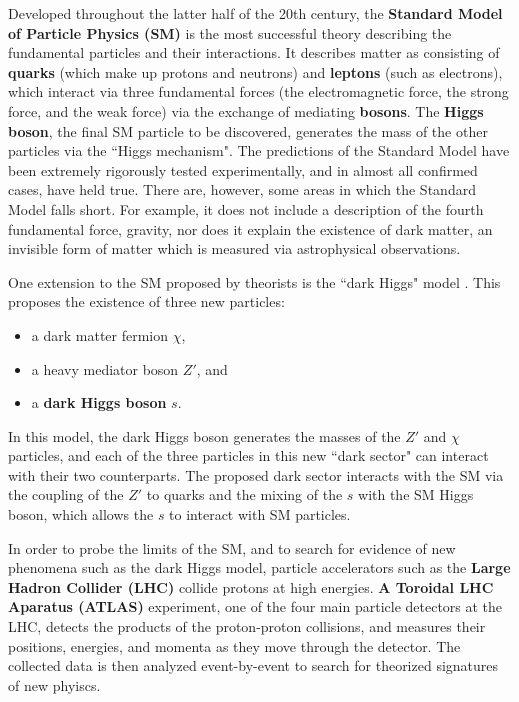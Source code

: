 \label{chapter:introduction}

Developed throughout the latter half of the 20th century, the \textbf{Standard Model of Particle Physics (SM)} \cite{peskin,schwartz,pdg_rev,Griffiths} is the most successful theory describing the fundamental particles and their interactions. It describes matter as consisting of \textbf{quarks} (which make up protons and neutrons) and \textbf{leptons} (such as electrons), which interact via three fundamental forces (the electromagnetic force, the strong force, and the weak force) via the exchange of mediating \textbf{bosons}. The \textbf{Higgs boson}, the final SM particle to be discovered, generates the mass of the other particles via the ``Higgs mechanism".  The predictions of the Standard Model have been extremely rigorously tested experimentally, and in almost all confirmed cases, have held true. There are, however, some areas in which the Standard Model falls short. For example, it does not include a description of the fourth fundamental force, gravity, nor does it explain the existence of dark matter, an invisible form of matter which is measured via astrophysical observations.

One extension to the SM proposed by theorists is the ``dark Higgs" model \cite{Hunting}. This proposes the existence of three new particles:
\begin{itemize}
\item a dark matter fermion $\chi$,
\item a heavy mediator boson $Z'$, and
\item a \textbf{dark Higgs boson} $s$.
\end{itemize}
In this model, the dark Higgs boson generates the masses of the $Z'$ and $\chi$ particles, and each of the three particles in this new ``dark sector" can interact with their two counterparts. The proposed dark sector interacts with the SM via the coupling of the $Z'$ to quarks and the mixing of the $s$ with the SM Higgs boson, which allows the $s$ to interact with SM particles.

In order to probe the limits of the SM, and to search for evidence of new phenomena such as the dark Higgs model, particle accelerators such as the \textbf{Large Hadron Collider (LHC)} collide protons at high energies. \textbf{A Toroidal LHC Aparatus (ATLAS)} experiment, one of the four main particle detectors at the LHC, detects the products of the proton-proton collisions, and measures their positions, energies, and momenta as they move through the detector. The collected data is then analyzed event-by-event to search for theorized signatures of new phyiscs.

